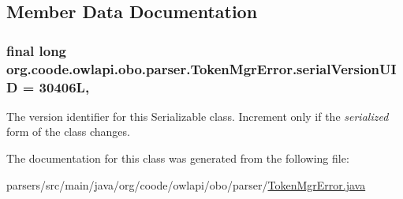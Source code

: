 \subsection{Member Data Documentation}
\hypertarget{classorg_1_1coode_1_1owlapi_1_1obo_1_1parser_1_1_token_mgr_error_a5a9eb76dc8964b8b32d78984db70b58e}{
\subsubsection[{serial\-Version\-U\-I\-D}]{\setlength{\rightskip}{0pt plus 5cm}final long org.\-coode.\-owlapi.\-obo.\-parser.\-Token\-Mgr\-Error.\-serial\-Version\-U\-I\-D = 30406\-L\hspace{0.3cm}{\ttfamily [static]}, {\ttfamily [private]}}}\label{classorg_1_1coode_1_1owlapi_1_1obo_1_1parser_1_1_token_mgr_error_a5a9eb76dc8964b8b32d78984db70b58e}
The version identifier for this Serializable class. Increment only if the {\itshape serialized} form of the class changes. 

The documentation for this class was generated from the following file\-:\begin{DoxyCompactItemize}
\item 
parsers/src/main/java/org/coode/owlapi/obo/parser/\hyperlink{org_2coode_2owlapi_2obo_2parser_2_token_mgr_error_8java}{Token\-Mgr\-Error.\-java}\end{DoxyCompactItemize}
